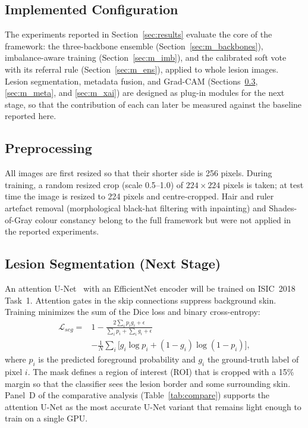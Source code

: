 \subsection{Implemented Configuration}\label{sec:impl}
The experiments reported in Section~\ref{sec:results} evaluate the core
of the framework: the three-backbone ensemble
(Section~\ref{sec:m_backbones}), imbalance-aware training
(Section~\ref{sec:m_imb}), and the calibrated soft vote with its
referral rule (Section~\ref{sec:m_ens}), applied to whole lesion
images. Lesion segmentation, metadata fusion, and Grad-CAM
(Sections~\ref{sec:m_seg}, \ref{sec:m_meta}, and \ref{sec:m_xai}) are
designed as plug-in modules for the next stage, so that the
contribution of each can later be measured against the baseline
reported here.

\subsection{Preprocessing}
All images are first resized so that their shorter side is 256 pixels.
During training, a random resized crop (scale 0.5--1.0) of
$224\times224$ pixels is taken; at test time the image is resized to
224 pixels and centre-cropped. Hair and ruler artefact removal
(morphological black-hat filtering with inpainting) and Shades-of-Gray
colour constancy belong to the full framework but were not applied in
the reported experiments.

\subsection{Lesion Segmentation (Next Stage)}\label{sec:m_seg}
An attention U-Net~\cite{oktay2018attunet} with an EfficientNet encoder
will be trained on ISIC~2018 Task~1. Attention gates in the skip
connections suppress background skin. Training minimizes the sum of
the Dice loss and binary cross-entropy:
\begin{equation}
\begin{split}
\mathcal{L}_{seg} ={}& 1-\frac{2\sum_i p_i g_i+\epsilon}{\sum_i p_i+\sum_i g_i+\epsilon}\\
 &-\frac{1}{N}\sum_i\big[g_i\log p_i+(1-g_i)\log(1-p_i)\big],
\end{split}
\label{eq:seg}
\end{equation}
where $p_i$ is the predicted foreground probability and $g_i$ the
ground-truth label of pixel $i$. The mask defines a region of interest
(ROI) that is cropped with a 15\% margin so that the classifier sees the
lesion border and some surrounding skin. Panel~D of the comparative
analysis (Table~\ref{tab:compare}) supports the attention U-Net as the
most accurate U-Net variant that remains light enough to train on a
single GPU.

